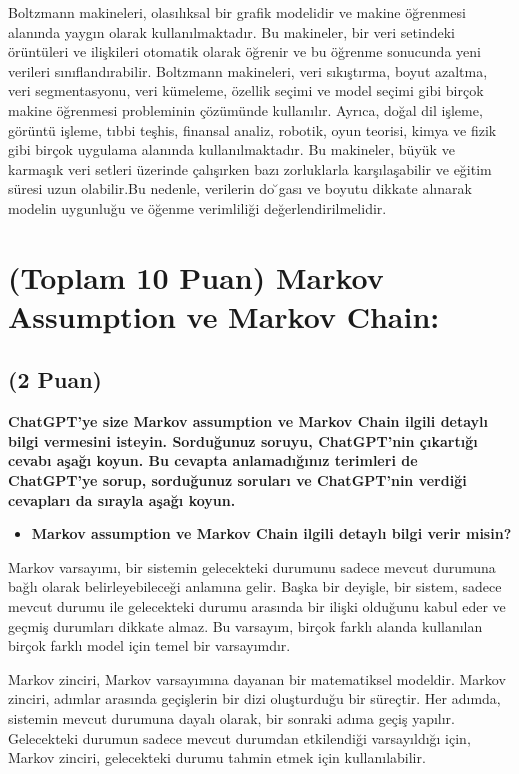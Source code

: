 \documentclass[11pt]{article}
\begin{document}
Boltzmann makineleri, olasılıksal bir grafik modelidir ve makine öğrenmesi alanında yaygın olarak kullanılmaktadır. Bu makineler, bir veri setindeki örüntüleri ve ilişkileri otomatik olarak öğrenir ve bu öğrenme sonucunda yeni verileri sınıflandırabilir. Boltzmann makineleri, veri sıkıştırma, boyut azaltma, veri segmentasyonu, veri kümeleme, özellik seçimi ve model seçimi gibi birçok makine öğrenmesi probleminin çözümünde kullanılır. Ayrıca, doğal dil işleme, görüntü işleme, tıbbi teşhis, finansal analiz, robotik, oyun teorisi, kimya ve fizik gibi birçok uygulama alanında kullanılmaktadır. Bu makineler, büyük ve karmaşık veri setleri üzerinde çalışırken bazı zorluklarla karşılaşabilir ve eğitim süresi uzun olabilir.Bu nedenle, verilerin do ̆gası ve boyutu dikkate alınarak modelin uygunluğu ve  öğenme verimliliği değerlendirilmelidir.

\section{(Toplam 10 Puan) Markov Assumption ve Markov Chain:}

\subsection{(2 Puan)} \textbf{ChatGPT’ye size Markov assumption ve Markov Chain ilgili detaylı bilgi vermesini isteyin. Sorduğunuz soruyu, ChatGPT'nin çıkartığı cevabı aşağı koyun. Bu cevapta anlamadığınız terimleri de ChatGPT’ye sorup, sorduğunuz soruları ve ChatGPT’nin verdiği cevapları da sırayla aşağı koyun.}

\begin{itemize}
    \item \textbf{Markov assumption ve Markov Chain ilgili detaylı bilgi verir misin?}
\end{itemize}
Markov varsayımı, bir sistemin gelecekteki durumunu sadece mevcut durumuna bağlı olarak belirleyebileceği anlamına gelir. Başka bir deyişle, bir sistem, sadece mevcut durumu ile gelecekteki durumu arasında bir ilişki olduğunu kabul eder ve geçmiş durumları dikkate almaz. Bu varsayım, birçok farklı alanda kullanılan birçok farklı model için temel bir varsayımdır.

Markov zinciri, Markov varsayımına dayanan bir matematiksel modeldir. Markov zinciri, adımlar arasında geçişlerin bir dizi oluşturduğu bir süreçtir. Her adımda, sistemin mevcut durumuna dayalı olarak, bir sonraki adıma geçiş yapılır. Gelecekteki durumun sadece mevcut durumdan etkilendiği varsayıldığı için, Markov zinciri, gelecekteki durumu tahmin etmek için kullanılabilir.
\end{document}
